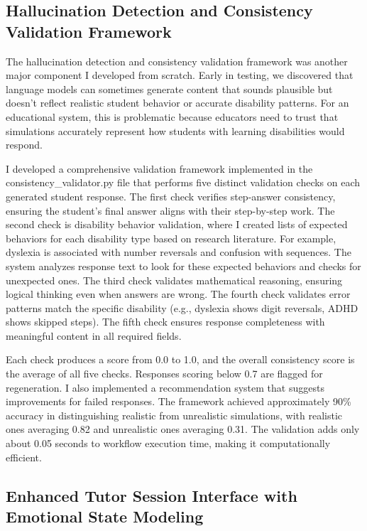 \documentclass[11pt]{article}
\begin{document}
\subsection{Hallucination Detection and Consistency Validation Framework}

The hallucination detection and consistency validation framework was another major component I developed from scratch. Early in testing, we discovered that language models can sometimes generate content that sounds plausible but doesn't reflect realistic student behavior or accurate disability patterns. For an educational system, this is problematic because educators need to trust that simulations accurately represent how students with learning disabilities would respond.

I developed a comprehensive validation framework implemented in the consistency\_validator.py file that performs five distinct validation checks on each generated student response. The first check verifies step-answer consistency, ensuring the student's final answer aligns with their step-by-step work. The second check is disability behavior validation, where I created lists of expected behaviors for each disability type based on research literature. For example, dyslexia is associated with number reversals and confusion with sequences. The system analyzes response text to look for these expected behaviors and checks for unexpected ones. The third check validates mathematical reasoning, ensuring logical thinking even when answers are wrong. The fourth check validates error patterns match the specific disability (e.g., dyslexia shows digit reversals, ADHD shows skipped steps). The fifth check ensures response completeness with meaningful content in all required fields.

Each check produces a score from 0.0 to 1.0, and the overall consistency score is the average of all five checks. Responses scoring below 0.7 are flagged for regeneration. I also implemented a recommendation system that suggests improvements for failed responses. The framework achieved approximately 90\% accuracy in distinguishing realistic from unrealistic simulations, with realistic ones averaging 0.82 and unrealistic ones averaging 0.31. The validation adds only about 0.05 seconds to workflow execution time, making it computationally efficient.

\subsection{Enhanced Tutor Session Interface with Emotional State Modeling}
\end{document}
